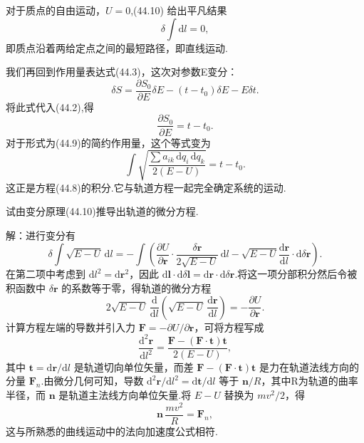 对于质点的自由运动，$U=0$,(44.10) 给出平凡结果
\begin{equation*}
  \delta\int\mathrm{d}l=0,
\end{equation*}
即质点沿着两给定点之间的最短路径，即直线运动.

我们再回到作用量表达式(44.3)，这次对参数E变分：
\begin{equation*}
  \delta S=\frac{\partial S_0}{\partial E}\delta E
  -(t-t_0)\delta E-E\delta t.
\end{equation*}
将此式代入(44.2),得
\begin{equation}
  \frac{\partial S_0}{\partial E}=t-t_0.
\end{equation}
对于形式为(44.9)的简约作用量，这个等式变为
\begin{equation}
  \int\sqrt{\frac{\sum a_{ik}\,\mathrm{d}q_i\,\mathrm{d}q_k}{2(E-U)}}=t-t_0.
\end{equation}
这正是方程(44.8)的积分.它与轨道方程一起完全确定系统的运动.

\begin{xiti}

\quad 试由变分原理(44.10)推导出轨道的微分方程.

解：进行变分有
\begin{equation*}
  \delta\int\sqrt{E-U}\,\mathrm{d}l
  =-\int\left(\frac{\partial U}{\partial\boldsymbol{r}}
  \cdot\frac{\delta\boldsymbol{r}}{2\sqrt{E-U}}\,\mathrm{d}l
  -\sqrt{E-U}\frac{\mathrm{d}\boldsymbol{r}}{\mathrm{d}l}
  \cdot\mathrm{d}\delta\boldsymbol{r}\right).
\end{equation*}
在第二项中考虑到 $\mathrm{d}l^2=\mathrm{d}\boldsymbol{r}^2$，因此
$\mathrm{d}\boldsymbol{l}\cdot\mathrm{d}\delta\boldsymbol{l}
=\mathrm{d}\boldsymbol{r}\cdot\mathrm{d}\delta\boldsymbol{r}$.将这一项分部积分然后令被积函数中
$\delta\boldsymbol{r}$ 的系数等于零，得轨道的微分方程
\begin{equation*}
  2\sqrt{E-U}\,\frac{\mathrm{d}}{\mathrm{d}l}
  \left(\sqrt{E-U}\,\frac{\mathrm{d}\boldsymbol{r}}{\mathrm{d}l}\right)
  =-\frac{\partial U}{\partial\boldsymbol{r}}.
\end{equation*}
计算方程左端的导数并引入力
$\boldsymbol{F}=-\partial U/\partial\boldsymbol{r}$，可将方程写成
\begin{equation*}
  \frac{\mathrm{d}^2\boldsymbol{r}}{\mathrm{d}l^2}
  =\frac{\boldsymbol{F}-(\boldsymbol{F}\cdot\boldsymbol{t})\boldsymbol{t}}
  {2(E-U)},
\end{equation*}
其中 $\boldsymbol{t}=\mathrm{d}\boldsymbol{r}/\mathrm{d}l$
是轨道切向单位矢量，而差
$\boldsymbol{F}-(\boldsymbol{F}\cdot\boldsymbol{t})\boldsymbol{t}$
是力在轨道法线方向的分量 $\boldsymbol{F}_n$.由微分几何可知，导数
$\mathrm{d}^2\boldsymbol{r}/\mathrm{d}l^2=\mathrm{d}\boldsymbol{t}/\mathrm{d}l$
等于 $\boldsymbol{n}/R$，其中R为轨道的曲率半径，而 $\boldsymbol{n}$
是轨道主法线方向单位矢量.将 $E-U$ 替换为 $mv^2/2$，得
\begin{equation*}
  \boldsymbol{n}\,\frac{mv^2}{R}=\boldsymbol{F}_n,
\end{equation*}
这与所熟悉的曲线运动中的法向加速度公式相符.

\end{xiti}

